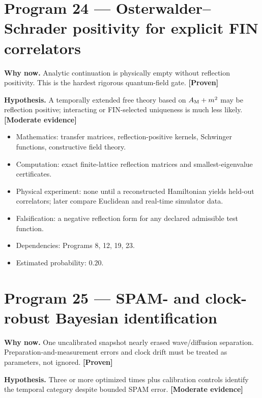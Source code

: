\documentclass[11pt,a4paper,openany]{report}
\newcommand{\statusProven}{\textcolor{fingreen}{[Proven]}}
\newcommand{\statusModerate}{\textcolor{finviolet}{[Moderate evidence]}}
\begin{document}
\section{Program 24 — Osterwalder–Schrader positivity for explicit FIN correlators}

\textbf{Why now.} Analytic continuation is physically empty without reflection positivity. This is the hardest rigorous quantum-field gate. \textbf{\statusProven{}}

\textbf{Hypothesis.} A temporally extended free theory based on \(A_{\rm M}+m^2\) may be reflection positive; interacting or FIN-selected uniqueness is much less likely. \textbf{\statusModerate{}}

\begin{itemize}
\item 
Mathematics: transfer matrices, reflection-positive kernels, Schwinger functions, constructive field theory.

\item 
Computation: exact finite-lattice reflection matrices and smallest-eigenvalue certificates.

\item 
Physical experiment: none until a reconstructed Hamiltonian yields held-out correlators; later compare Euclidean and real-time simulator data.

\item 
Falsification: a negative reflection form for any declared admissible test function.

\item 
Dependencies: Programs 8, 12, 19, 23.

\item 
Estimated probability: \(0.20\).

\end{itemize}

\section{Program 25 — SPAM- and clock-robust Bayesian identification}

\textbf{Why now.} One uncalibrated snapshot nearly erased wave/\allowbreak{}diffusion separation. Preparation-and-measurement errors and clock drift must be treated as parameters, not ignored. \textbf{\statusProven{}}

\textbf{Hypothesis.} Three or more optimized times plus calibration controls identify the temporal category despite bounded SPAM error. \textbf{\statusModerate{}}
\end{document}
